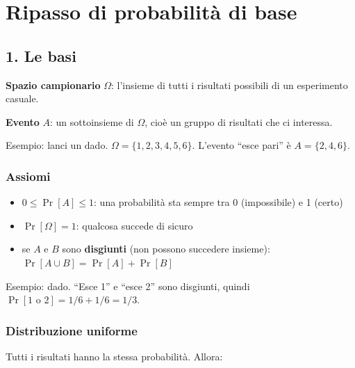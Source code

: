 
\chapter{Ripasso di probabilità di base}

\section{1. Le basi}

\textbf{Spazio campionario} \(\Omega\): l'insieme di tutti i risultati possibili di un esperimento casuale.

\textbf{Evento} \(A\): un sottoinsieme di \(\Omega\), cioè un gruppo di risultati che ci interessa.

\begin{esempio}

Esempio: lanci un dado. \(\Omega = \{1,2,3,4,5,6\}\). L'evento ``esce pari'' è \(A = \{2,4,6\}\).

\end{esempio}

\subsection{Assiomi}

\begin{itemize}
\tightlist
\item
  \(0 \le \Pr[A] \le 1\): una probabilità sta sempre tra 0 (impossibile) e 1 (certo)
\item
  \(\Pr[\Omega] = 1\): qualcosa succede di sicuro
\item
  se \(A\) e \(B\) sono \textbf{disgiunti} (non possono succedere insieme): \(\Pr[A \cup B] = \Pr[A] + \Pr[B]\)
\end{itemize}

\begin{esempio}

Esempio: dado. ``Esce 1'' e ``esce 2'' sono disgiunti, quindi \(\Pr[\text{1 o 2}] = 1/6 + 1/6 = 1/3\).

\end{esempio}

\subsection{Distribuzione uniforme}

Tutti i risultati hanno la stessa probabilità. Allora:

